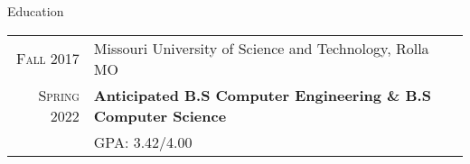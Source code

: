 \documentclass{resume}
\begin{document}



\begin{rSection}{Education}
    \small
    {
        \begin{tabular}{r|p{15cm}}
            \textsc{Fall} 2017 & Missouri University of Science and Technology, Rolla MO  \\ 
            \textsc{Spring} 2022 & \textbf{Anticipated B.S Computer Engineering \& B.S Computer Science} \\
                              & GPA: 3.42/4.00 \\
        \end{tabular}
    }
\end{rSection}
\end{document}
